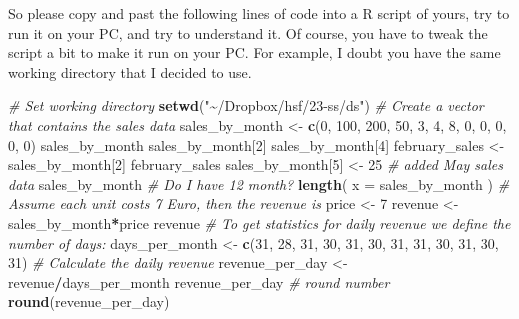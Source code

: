 \documentclass[
  12pt,
  oneside]{book}
\newenvironment{Shaded}{\begin{snugshade}}{\end{snugshade}}
\newcommand{\AttributeTok}[1]{\textcolor[rgb]{0.13,0.29,0.53}{#1}}
\newcommand{\CommentTok}[1]{\textcolor[rgb]{0.56,0.35,0.01}{\textit{#1}}}
\newcommand{\DecValTok}[1]{\textcolor[rgb]{0.00,0.00,0.81}{#1}}
\newcommand{\FunctionTok}[1]{\textcolor[rgb]{0.13,0.29,0.53}{\textbf{#1}}}
\newcommand{\NormalTok}[1]{#1}
\newcommand{\OtherTok}[1]{\textcolor[rgb]{0.56,0.35,0.01}{#1}}
\newcommand{\SpecialCharTok}[1]{\textcolor[rgb]{0.81,0.36,0.00}{\textbf{#1}}}
\newcommand{\StringTok}[1]{\textcolor[rgb]{0.31,0.60,0.02}{#1}}
\begin{document}
So please copy and past the following lines of code into a R script of yours, try to run it on your PC, and try to understand it. Of course, you have to tweak the script a bit to make it run on your PC. For example, I doubt you have the same working directory that I decided to use.

\begin{Shaded}
\begin{Highlighting}[]
\CommentTok{\# Set working directory}
\FunctionTok{setwd}\NormalTok{(}\StringTok{"\textasciitilde{}/Dropbox/hsf/23{-}ss/ds"}\NormalTok{)}
\CommentTok{\# Create a vector that contains the sales data}
\NormalTok{sales\_by\_month }\OtherTok{\textless{}{-}} \FunctionTok{c}\NormalTok{(}\DecValTok{0}\NormalTok{, }\DecValTok{100}\NormalTok{, }\DecValTok{200}\NormalTok{, }\DecValTok{50}\NormalTok{, }\DecValTok{3}\NormalTok{, }\DecValTok{4}\NormalTok{, }\DecValTok{8}\NormalTok{, }\DecValTok{0}\NormalTok{, }\DecValTok{0}\NormalTok{, }\DecValTok{0}\NormalTok{, }\DecValTok{0}\NormalTok{, }\DecValTok{0}\NormalTok{)}
\NormalTok{sales\_by\_month}
\NormalTok{sales\_by\_month[}\DecValTok{2}\NormalTok{]}
\NormalTok{sales\_by\_month[}\DecValTok{4}\NormalTok{]}
\NormalTok{february\_sales }\OtherTok{\textless{}{-}}\NormalTok{ sales\_by\_month[}\DecValTok{2}\NormalTok{]}
\NormalTok{february\_sales}
\NormalTok{sales\_by\_month[}\DecValTok{5}\NormalTok{] }\OtherTok{\textless{}{-}} \DecValTok{25} \CommentTok{\# added May sales data}
\NormalTok{sales\_by\_month}
\CommentTok{\# Do I have 12 month?}
\FunctionTok{length}\NormalTok{( }\AttributeTok{x =}\NormalTok{ sales\_by\_month )}
\CommentTok{\# Assume each unit costs 7 Euro, then the revenue is}
\NormalTok{price }\OtherTok{\textless{}{-}} \DecValTok{7}
\NormalTok{revenue }\OtherTok{\textless{}{-}}\NormalTok{ sales\_by\_month}\SpecialCharTok{*}\NormalTok{price}
\NormalTok{revenue}
\CommentTok{\# To get statistics for daily revenue we define the number of days:}
\NormalTok{days\_per\_month }\OtherTok{\textless{}{-}} \FunctionTok{c}\NormalTok{(}\DecValTok{31}\NormalTok{, }\DecValTok{28}\NormalTok{, }\DecValTok{31}\NormalTok{, }\DecValTok{30}\NormalTok{, }\DecValTok{31}\NormalTok{, }\DecValTok{30}\NormalTok{, }\DecValTok{31}\NormalTok{, }\DecValTok{31}\NormalTok{, }\DecValTok{30}\NormalTok{, }\DecValTok{31}\NormalTok{, }\DecValTok{30}\NormalTok{, }\DecValTok{31}\NormalTok{)}
\CommentTok{\# Calculate the daily revenue}
\NormalTok{revenue\_per\_day }\OtherTok{\textless{}{-}}\NormalTok{ revenue}\SpecialCharTok{/}\NormalTok{days\_per\_month}
\NormalTok{revenue\_per\_day }
\CommentTok{\# round number }
\FunctionTok{round}\NormalTok{(revenue\_per\_day) }
\end{Highlighting}
\end{Shaded}
\end{document}

